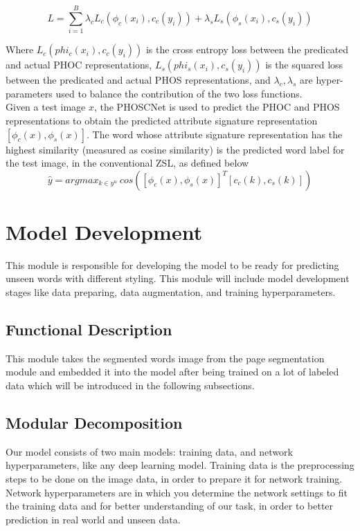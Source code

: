 \begin{equation}
    L= \sum_{i=1}^B \lambda_c L_c(\phi_c(x_i), c_c(y_i)) + \lambda_s L_s(\phi_s(x_i), c_s(y_i))
    \label{equ:phosc-loss-function}
\end{equation}

Where $L_c(phi_c(x_i), c_c(y_i))$ is the cross entropy loss between the predicated and actual PHOC representations, $L_s(phi_s(x_i), c_s(y_i))$ is the squared loss between the predicated and actual PHOS representations, and $\lambda_c , \lambda_s$ are hyper-parameters used to balance the contribution of the two loss functions. \\

Given a test image $x$, the PHOSCNet is used to predict the PHOC and PHOS representations to obtain the predicted attribute signature representation $[\phi_c(x), \phi_s(x)]$. The  word whose attribute signature representation has the highest similarity (measured as cosine similarity) is the predicted word label for the test image, in the conventional ZSL, as defined below
\begin{equation}
    \hat y = argmax_{k\in y^u} \: cos([\phi_c(x), \phi_s(x)]^T[c_c(k), c_s(k)])
    \label{equ:cosine-similarity}
\end{equation}

\section{Model Development}
This module is responsible for developing the model to be ready for predicting unseen words with different styling. This module will include model development stages like data preparing, data augmentation, and training hyperparameters.

\subsection{Functional Description}
This module takes the segmented words image from the page segmentation module and embedded it into the model after being trained on a lot of labeled data which will be introduced in the following subsections.


\subsection{Modular Decomposition}
Our model consists of two main models: training data, and network hyperparameters, like any deep learning model. Training data is the preprocessing steps to be done on the image data, in order to prepare it for network training. Network hyperparameters are in which you determine the network settings to fit the training data and for better understanding of our task, in order to better prediction in real world and unseen data.

